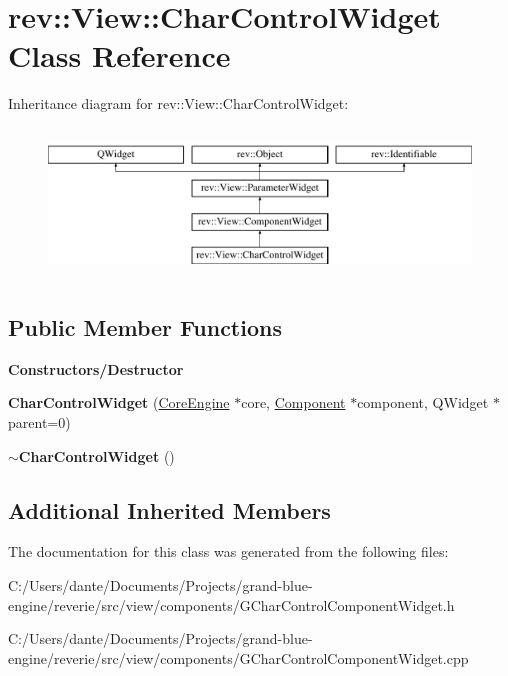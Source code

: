 \hypertarget{classrev_1_1_view_1_1_char_control_widget}{}\section{rev\+::View\+::Char\+Control\+Widget Class Reference}
\label{classrev_1_1_view_1_1_char_control_widget}
Inheritance diagram for rev\+::View\+::Char\+Control\+Widget\+:\begin{figure}[H]
\begin{center}
\leavevmode
\includegraphics[height=4.000000cm]{classrev_1_1_view_1_1_char_control_widget}
\end{center}
\end{figure}
\subsection*{Public Member Functions}
\begin{Indent}\textbf{ Constructors/\+Destructor}\par
\begin{DoxyCompactItemize}
\item 
\mbox{\label{classrev_1_1_view_1_1_char_control_widget_ac8390c103618193d1ebdd37855689fab}} 
{\bfseries Char\+Control\+Widget} (\mbox{\hyperlink{classrev_1_1_core_engine}{Core\+Engine}} $\ast$core, \mbox{\hyperlink{classrev_1_1_component}{Component}} $\ast$component, Q\+Widget $\ast$parent=0)
\item 
\mbox{\label{classrev_1_1_view_1_1_char_control_widget_a5e48f884c65825e542bd46f2140ad03f}} 
{\bfseries $\sim$\+Char\+Control\+Widget} ()
\end{DoxyCompactItemize}
\end{Indent}
\subsection*{Additional Inherited Members}


The documentation for this class was generated from the following files\+:\begin{DoxyCompactItemize}
\item 
C\+:/\+Users/dante/\+Documents/\+Projects/grand-\/blue-\/engine/reverie/src/view/components/G\+Char\+Control\+Component\+Widget.\+h\item 
C\+:/\+Users/dante/\+Documents/\+Projects/grand-\/blue-\/engine/reverie/src/view/components/G\+Char\+Control\+Component\+Widget.\+cpp\end{DoxyCompactItemize}
